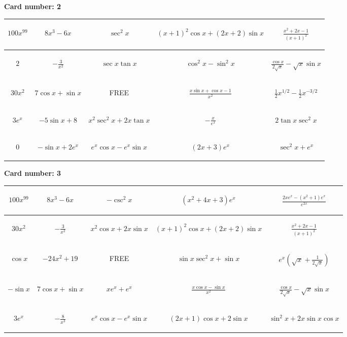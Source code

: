 \documentclass{article}
\newcommand{\entry}[1]{\begin{minipage}[t][2.75cm][t]{4cm} \vspace{1cm} \begin{center}#1\end{center} \end{minipage}}
\newcommand{\freespace}{\entry{FREE}}
\newcommand{\cardnumber}[1]{\noindent \textbf{Card number: #1} \bigskip}
\begin{document}
\pagebreak

\cardnumber{2}
\begin{center}
\begin{tabular}{|*{5}{c|}}
    \hline
    \entry{$100x^{99}$} & \entry{$8x^3 - 6x$} & \entry{$\sec^2 x$} & \entry{$(x + 1)^2 \cos x + (2x + 2) \sin x$} & \entry{$\frac{x^2 + 2x - 1}{(x + 1)^2}$} \\ \hline
    \entry{$2$} & \entry{$-\frac{3}{x^2}$} & \entry{$\sec x \tan x$} & \entry{$\cos^2 x - \sin^2 x$} & \entry{$\frac{\cos x}{2 \sqrt{x}} - \sqrt{x} \sin x$} \\ \hline
    \entry{$30x^2$} & \entry{$7 \cos x + \sin x$} & \freespace & \entry{$\frac{x \sin x + \cos x - 1}{x^2}$} & \entry{$\frac{1}{2} x^{1/2} - \frac{1}{2} x^{-3/2}$} \\ \hline
    \entry{$3e^x$} & \entry{$-5 \sin x + 8$} & \entry{$x^2 \sec^2 x + 2x \tan x$} & \entry{$-\frac{x}{e^x}$} & \entry{$2 \tan x \sec^2 x$} \\ \hline
    \entry{$0$} & \entry{$-\sin x + 2e^x$} & \entry{$e^x \cos x - e^x \sin x$} & \entry{$(2x + 3) e^x$} & \entry{$\sec^2 x + e^x$} \\ \hline
\end{tabular}
\end{center}

\pagebreak

\cardnumber{3}
\begin{center}
\begin{tabular}{|*{5}{c|}}
    \hline
    \entry{$100x^{99}$} & \entry{$8x^3 - 6x$} & \entry{$-\csc^2 x$} & \entry{$(x^2 + 4x + 3) e^x$} & \entry{$\frac{2x e^x - (x^2 + 1) e^x}{e^{2x}}$} \\ \hline
    \entry{$30x^2$} & \entry{$-\frac{3}{x^2}$} & \entry{$x^2 \cos x + 2x \sin x$} & \entry{$(x + 1)^2 \cos x + (2x + 2) \sin x$} & \entry{$\frac{x^2 + 2x - 1}{(x + 1)^2}$} \\ \hline
    \entry{$\cos x$} & \entry{$-24x^2 + 19$} & \freespace & \entry{$\sin x \sec^2 x + \sin x$} & \entry{$e^x \left(\sqrt{x} + \frac{1}{2\sqrt{x}}\right)$} \\ \hline
    \entry{$-\sin x$} & \entry{$7 \cos x + \sin x$} & \entry{$x e^x + e^x$} & \entry{$\frac{x \cos x - \sin x}{x^2}$} & \entry{$\frac{\cos x}{2 \sqrt{x}} - \sqrt{x} \sin x$} \\ \hline
    \entry{$3e^x$} & \entry{$-\frac{8}{x^3}$} & \entry{$e^x \cos x - e^x \sin x$} & \entry{$(2x + 1) \cos x + 2 \sin x$} & \entry{$\sin^2 x + 2x \sin x \cos x$} \\ \hline
\end{tabular}
\end{center}
\end{document}
